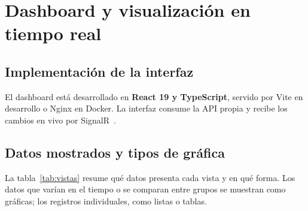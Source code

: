 \documentclass[10pt,a4paper]{article}
\newcommand{\newsection}[1]{\clearpage\section{#1}}
\begin{document}
\newsection{Dashboard y visualización en tiempo real}
\label{sec:dashboard}
\subsection{Implementación de la interfaz}
El dashboard está desarrollado en \textbf{React 19 y TypeScript}, servido por Vite en desarrollo o Nginx en Docker. La interfaz consume la API propia y recibe los cambios en vivo por SignalR~\cite{signalr}.

\subsection{Datos mostrados y tipos de gráfica}
\label{sec:graficas}
La tabla~\ref{tab:vistas} resume qué datos presenta cada vista y en qué forma. Los datos que varían en el tiempo o se comparan entre grupos se muestran como gráficas; los registros individuales, como listas o tablas.
\end{document}
